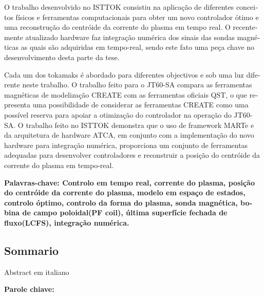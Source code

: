\begin{otherlanguage}{portuguese}
O trabalho desenvolvido no ISTTOK consistiu na aplicação de diferentes conceitos físicos e ferramentas computacionais  para obter um novo controlador ótimo e uma reconstrução do centróide da corrente do plasma em tempo real. O recentemente atualizado hardware faz integração numérica dos sinais das sondas magnéticas as quais são adquiridas em tempo-real, sendo este fato uma peça chave no desenvolvimento desta parte da tese.\smallskip

Cada um dos tokamaks é abordado para diferentes objectivos e sob uma luz diferente neste trabalho. O trabalho feito para o JT60-SA compara as ferramentas magnéticas de modelização CREATE  com as ferramentas oficiais QST, o que representa uma possibilidade de considerar as ferramentas CREATE como uma possível reserva para apoiar a otimização do controlador na operação do JT60-SA. O trabalho feito no ISTTOK demonstra que o uso de framework MARTe e da arquitetura de hardware ATCA, em conjunto com a implementação do novo hardware para integração numérica, proporciona um conjunto de ferramentas adequadas para desenvolver controladores e reconstruir a posição do centróide da corrente do plasma em tempo-real.
\smallskip

\vfill
\textbf{ Palavras-chave: Controlo em tempo real, corrente do plasma, posição do centróide da corrente do plasma, modelo em espaço de estados, controlo óptimo, controlo da forma do plasma, sonda magnética, bobina de campo poloidal(PF coil), última superfície fechada de fluxo(LCFS), integração numérica.    } 

\end{otherlanguage}
\pagebreak
\begin{otherlanguage}{italian}
\chapter*{Sommario}

Abstract em italiano


\vfill

\textbf{Parole chiave:} 
\end{otherlanguage}



